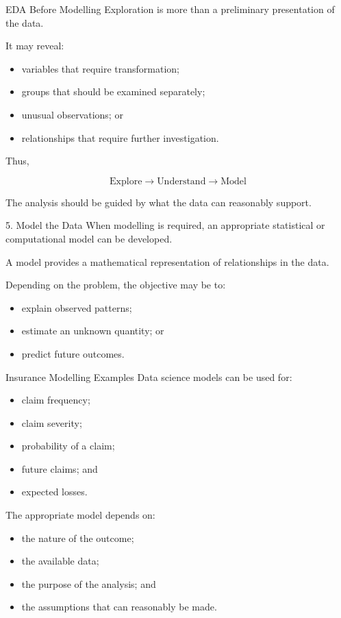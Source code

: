 \documentclass[
  ignorenonframetext,
  aspectratio=169,
]{beamer}
\providecommand{\tightlist}{%
  \setlength{\itemsep}{0pt}\setlength{\parskip}{0pt}}
\begin{document}
\begin{frame}{EDA Before Modelling}
\protect{}\label{eda-before-modelling}
Exploration is more than a preliminary presentation of the data.

It may reveal:

\begin{itemize}
\tightlist
\item
  variables that require transformation;
\item
  groups that should be examined separately;
\item
  unusual observations; or
\item
  relationships that require further investigation.
\end{itemize}

Thus,

\[
\boxed{
\text{Explore}
\rightarrow
\text{Understand}
\rightarrow
\text{Model}
}
\]

The analysis should be guided by what the data can reasonably support.
\end{frame}

\begin{frame}{5. Model the Data}
\protect{}\label{model-the-data}
When modelling is required, an appropriate statistical or computational
model can be developed.

A model provides a mathematical representation of relationships in the
data.

Depending on the problem, the objective may be to:

\begin{itemize}
\tightlist
\item
  explain observed patterns;
\item
  estimate an unknown quantity; or
\item
  predict future outcomes.
\end{itemize}
\end{frame}

\begin{frame}{Insurance Modelling Examples}
\protect{}\label{insurance-modelling-examples}
Data science models can be used for:

\begin{itemize}
\tightlist
\item
  claim frequency;
\item
  claim severity;
\item
  probability of a claim;
\item
  future claims; and
\item
  expected losses.
\end{itemize}

The appropriate model depends on:

\begin{itemize}
\tightlist
\item
  the nature of the outcome;
\item
  the available data;
\item
  the purpose of the analysis; and
\item
  the assumptions that can reasonably be made.
\end{itemize}
\end{frame}
\end{document}
